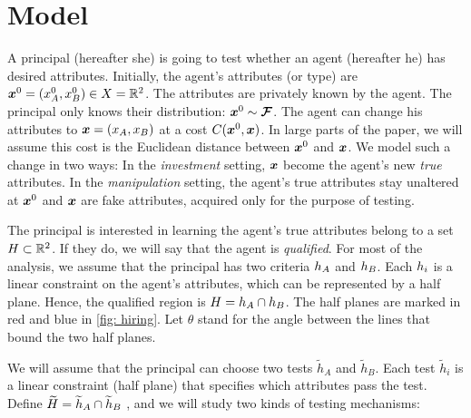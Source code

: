 \section{Model}
A principal (hereafter she) is going to test whether an agent (hereafter he)
has desired attributes. Initially, the agent's attributes (or type) are $\boldsymbol{x}^0=(x^0_{A},x^0_{B})\in X = 
\mathbb{R}
^{2}$. The attributes are privately known by the agent. The principal only
knows their distribution: $\boldsymbol{x}^0\sim \boldsymbol{\mathcal{F}}$. The agent can change his attributes to $\boldsymbol{x}=(x_{A},x_{B})$
at a cost $C(\boldsymbol{x}^0,\boldsymbol{x})$. In large parts of the paper, we will assume this cost
is the Euclidean distance between $\boldsymbol{x}^0$ and $\boldsymbol{x}$. We model such a change in two ways: In the \textit{investment}
setting,  $\boldsymbol{x}$
become the agent's new \textit{true} attributes.  In the \textit{manipulation}
setting,  the agent's true attributes stay unaltered at $\boldsymbol{x}^0$ and $\boldsymbol{x}$ are fake attributes, acquired only for the purpose of testing. 

The principal is interested in learning  the agent's true attributes belong to
a set $H\subset 
\mathbb{R}
^{2}$. If they do, we will say that the agent is \textit{qualified}. For
most of the analysis,  we assume that the principal has two criteria $h_A$ and $h_B$.
Each $h_i$ is a linear constraint on the agent's attributes, which can be represented by a half plane.
Hence, the qualified region is $H=h_{A}\cap h_{B}$. 
The half planes are marked in red and blue in \cref{fig: hiring}. 
Let $\theta $ stand for the angle between the lines that
bound the two half planes. 

We will assume that the principal can choose two tests $\widetilde{h}_{A}$ and $\widetilde{h}_{B}$. 
Each test $\widetilde{h}_{i}$ is a linear constraint (half plane) that specifies which attributes pass the test. 
Define $\widetilde{H}=\widetilde{h}_{A}\cap \widetilde{h}_{B}$%
, and we will study two kinds of testing mechanisms:

